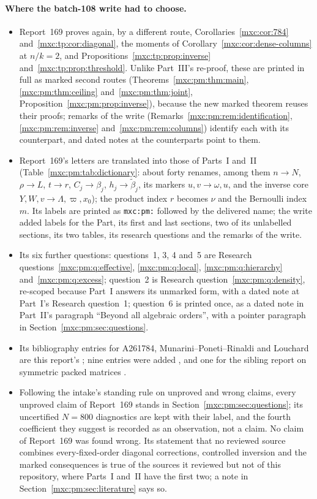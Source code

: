 \documentclass[11pt]{article}
\numberwithin{equation}{section}
\theoremstyle{definition}
\theoremstyle{remark}
\begin{document}
\paragraph{Where the batch-108 write had to choose.}
\begin{itemize}
\item Report~169 proves again, by a different route, Corollaries~\ref{mxc:cor:784}
 and~\ref{mxc:tp:cor:diagonal}, the moments of
 Corollary~\ref{mxc:cor:dense-columns} at $n/k=2$, and
 Propositions~\ref{mxc:tp:prop:inverse} and~\ref{mxc:tp:prop:threshold}.
 Unlike Part~III's re-proof, these are printed in full as marked second
 routes (Theorems~\ref{mxc:pm:thm:main}, \ref{mxc:pm:thm:ceiling}
 and~\ref{mxc:pm:thm:joint}, Proposition~\ref{mxc:pm:prop:inverse}), because
 the new marked theorem reuses their proofs; remarks of the write
 (Remarks~\ref{mxc:pm:rem:identification}, \ref{mxc:pm:rem:inverse}
 and~\ref{mxc:pm:rem:columns}) identify each with its counterpart, and dated
 notes at the counterparts point to them.
\item Report~169's letters are translated into those of Parts~I and~II
 (Table~\ref{mxc:pm:tab:dictionary}: about forty renames, among them $n\to N$,
 $\rho\to L$, $t\to r$, $C_j\to\beta_j$, $h_j\to\widetilde\beta_j$, its markers
 $u,v\to\omega,u$, and the inverse core $Y,W,v\to\Lambda,\varpi,x_0$); the
 product index $r$ becomes $\nu$ and the Bernoulli index $m$. Its labels are
 printed as \texttt{mxc:pm:} followed by the delivered name; the write added
 labels for the Part, its first and last sections, two of its unlabelled
 sections, its two tables, its research questions and the remarks of the
 write.
\item Its six further questions: questions~1, 3, 4 and~5 are Research
 questions~\ref{mxc:pm:q:effective}, \ref{mxc:pm:q:local},
 \ref{mxc:pm:q:hierarchy} and~\ref{mxc:pm:q:excess}; question~2 is Research
 question~\ref{mxc:pm:q:density}, re-scoped because Part~I answers its
 unmarked form, with a dated note at Part~I's Research question~1; question~6
 is printed once, as a dated note in Part~II's paragraph ``Beyond all
 algebraic orders'', with a pointer paragraph in
 Section~\ref{mxc:pm:sec:questions}.
\item Its bibliography entries for A261784, Munarini--Poneti--Rinaldi and
 Louchard are this report's \cite{oeis784,mpr2009,louchard}; nine entries were
 added \cite{pmkot15,pmcps,pmcpsclasses,pmcc23,pmcc25,pmdht,pmgm,pmklm,pmhjs},
 and one for the sibling report on symmetric packed matrices \cite{pmspm}.
\item Following the intake's standing rule on unproved and wrong claims,
 every unproved claim of Report~169 stands in
 Section~\ref{mxc:pm:sec:questions}; its uncertified $N=800$ diagnostics are
 kept with their label, and the fourth coefficient they suggest is recorded
 as an observation, not a claim. No claim of Report~169 was found wrong. Its
 statement that no reviewed source combines every-fixed-order diagonal
 corrections, controlled inversion and the marked consequences is true of
 the sources it reviewed but not of this repository, where Parts~I and~II have
 the first two; a note in Section~\ref{mxc:pm:sec:literature} says so.
\end{itemize}
\end{document}
